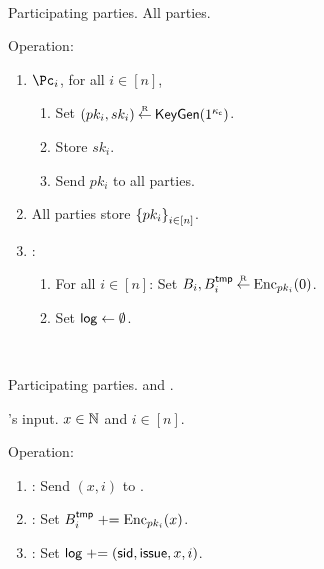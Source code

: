 \begin{protocol}~\label{prot:ConfidentialTransactions:Init}
	\item[Participating parties.] All parties.
			
			\item Operation:
			
			
			\begin{enumerate}
				
				\item   $\Pc_i$, for  all $i\in [n]$,
				\begin{enumerate}
					\item Set $(pk_i,sk_i) \mathbin{\stackrel{\mbox{\tiny R}}{\leftarrow}} \mathsf{KeyGen}(1^{\kappa_{\mathsf c}})$.
					
					\item Store $sk_i$.
					
					\item Send $pk_i$ to all parties.
				\end{enumerate}
				
				\item All parties  store $\set{pk_i}_{i\in [n]}$.
				
				\item \Cc: 
				\begin{enumerate}
					\item 	For  all $i\in [n]$: Set $B_i,B_i^{\mathsf{tmp}} \mathbin{\stackrel{\mbox{\tiny R}}{\leftarrow}} \operatorname{Enc}_{pk_i}(0)$.
					
					\item    Set $\mathsf{log} \leftarrow \emptyset$.
				\end{enumerate}								
			\end{enumerate}
\end{protocol}


\begin{protocol}~\label{prot:ConfidentialTransactions:Issue}
	\item[Participating parties.] \Ic and \Cc.
	
	
	\item[\Cc's input.] $x\in {\mathbb{N}}$ and $i\in [n]$.
	
	\item Operation:
	
	
	\begin{enumerate}
		
		\item   \Ic: Send $(x,i)$ to \Cc.
		
		\item \Cc:  Set $B_i^{\mathsf{tmp}} \mathrel{+}= \operatorname{Enc}_{pk_i}(x)$.
	
	 \item \Cc:  Set $\mathsf{log} \mathrel{+}= (\mathsf{sid},\mathsf{issue},x,i)$.
		
	\end{enumerate}
\end{protocol}


